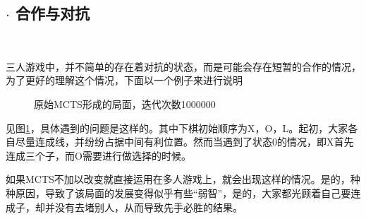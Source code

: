 \documentclass[9pt,twocolumn,twoside]{osajnl}
\begin{document}
\subsection{$\cdot$ 合作与对抗}
\begin{adjustwidth}{2em}{}
	\ \ \ \ \
	
	三人游戏中，并不简单的存在着对抗的状态，而是可能会存在短暂的合作的情况，为了更好的理解这个情况，下面以一个例子来进行说明
	
	\begin{figure}[htbp]
		\centering
		\caption{原始MCTS形成的局面，迭代次数1000000}
		\label{FailureCaseStudy}
	\end{figure}	
	

	
	见图\ref{FailureCaseStudy}，具体遇到的问题是这样的。其中下棋初始顺序为X，O，L。起初，大家各自尽量连成线，并纷纷占据中间有利位置。然而当遇到了状态0的情况，即X首先连成三个子，而O需要进行做选择的时候。
	
	如果MCTS不加以改变就直接运用在多人游戏上，就会出现这样的情况。是的，种种原因，导致了该局面的发展变得似乎有些“弱智”，是的，大家都光顾着自己要连成子，却并没有去堵别人，从而导致先手必胜的结果。
	

\end{adjustwidth}
\end{document}
